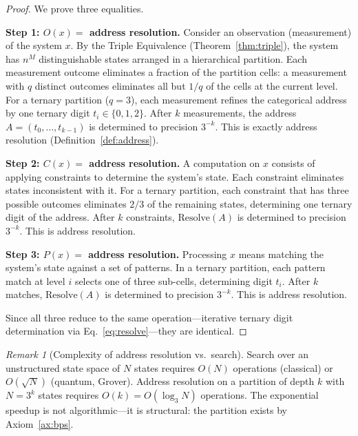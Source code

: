 \documentclass[10pt,twocolumn]{article}
\theoremstyle{definition}
\theoremstyle{remark}
\newtheorem{remark}[theorem]{Remark}
\begin{document}
\begin{proof}
We prove three equalities.

\medskip\noindent
\textbf{Step 1: $O(x) =$ address resolution.}
Consider an observation (measurement) of the system $x$.  By
the Triple Equivalence (Theorem~\ref{thm:triple}), the system
has $n^M$ distinguishable states arranged in a hierarchical
partition.  Each measurement outcome eliminates a fraction of
the partition cells: a measurement with $q$ distinct outcomes
eliminates all but $1/q$ of the cells at the current level.
For a ternary partition ($q=3$), each measurement refines the
categorical address by one ternary digit $t_i\in\{0,1,2\}$.
After $k$ measurements, the address
$A=(t_0,\dots,t_{k-1})$ is determined to precision $3^{-k}$.
This is exactly address resolution (Definition~\ref{def:address}).

\medskip\noindent
\textbf{Step 2: $C(x) =$ address resolution.}
A computation on $x$ consists of applying constraints to
determine the system's state.  Each constraint eliminates
states inconsistent with it.  For a ternary partition, each
constraint that has three possible outcomes eliminates $2/3$ of
the remaining states, determining one ternary digit of the
address.  After $k$ constraints,
$\mathrm{Resolve}(A)$ is determined to precision $3^{-k}$.
This is address resolution.

\medskip\noindent
\textbf{Step 3: $P(x) =$ address resolution.}
Processing $x$ means matching the system's state against a set
of patterns.  In a ternary partition, each pattern match at
level $i$ selects one of three sub-cells, determining digit
$t_i$.  After $k$ matches, $\mathrm{Resolve}(A)$ is
determined to precision $3^{-k}$.  This is address resolution.

\medskip\noindent
Since all three reduce to the same operation---iterative
ternary digit determination via
Eq.~\eqref{eq:resolve}---they are identical.
\end{proof}

\begin{remark}[Complexity of address resolution vs.\ search]
\label{rem:complexity}
Search over an unstructured state space of $N$ states requires
$O(N)$ operations (classical) or $O(\sqrt{N})$ (quantum,
Grover).  Address resolution on a partition of depth $k$ with
$N=3^k$ states requires $O(k)=O(\log_3 N)$ operations.  The
exponential speedup is not algorithmic---it is structural: the
partition exists by Axiom~\ref{ax:bps}.
\end{remark}
\end{document}
